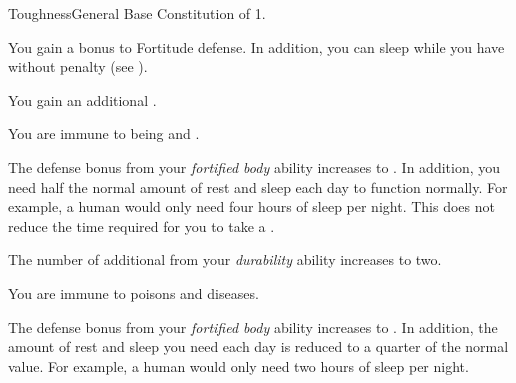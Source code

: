     \begin{feat}{Toughness}{General}
        \featpre Base Constitution of 1.

         You gain a  bonus to Fortitude defense.
        In addition, you can sleep while you have  without penalty (see ).

         You gain an additional .

         You are immune to being  and .

         The defense bonus from your \textit{fortified body} ability increases to .
        In addition, you need half the normal amount of rest and sleep each day to function normally.
        For example, a human would only need four hours of sleep per night.
        This does not reduce the time required for you to take a .

         The number of additional  from your \textit{durability} ability increases to two.

         You are immune to poisons and diseases.

         The defense bonus from your \textit{fortified body} ability increases to .
        In addition, the amount of rest and sleep you need each day is reduced to a quarter of the normal value.
        For example, a human would only need two hours of sleep per night.
    \end{feat}

